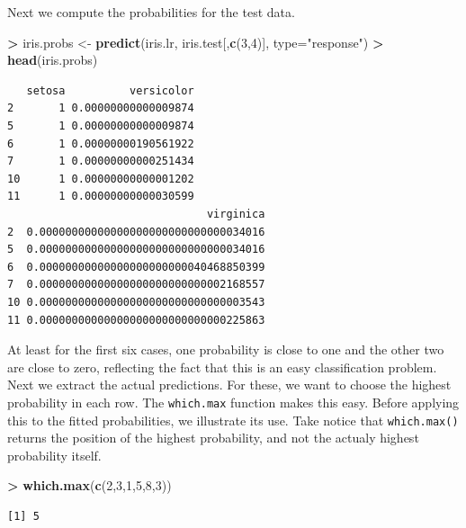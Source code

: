 \documentclass[
]{krantz}
\makeatletter
\newenvironment{Shaded}{\begin{snugshade}}{\end{snugshade}}
\newcommand{\DataTypeTok}[1]{\textcolor[rgb]{0.27,0.27,0.27}{#1}}
\newcommand{\DecValTok}[1]{\textcolor[rgb]{0.06,0.06,0.06}{#1}}
\newcommand{\KeywordTok}[1]{\textcolor[rgb]{0.27,0.27,0.27}{\textbf{#1}}}
\newcommand{\NormalTok}[1]{#1}
\newcommand{\OperatorTok}[1]{\textcolor[rgb]{0.43,0.43,0.43}{\textbf{#1}}}
\newcommand{\StringTok}[1]{\textcolor[rgb]{0.5,0.5,0.5}{#1}}
\newenvironment{kframe}{%
\medskip{}
\setlength{\fboxsep}{.8em}
 \def\at@end@of@kframe{}%
 \ifinner\ifhmode%
  \def\at@end@of@kframe{\end{minipage}}%
  \begin{minipage}{\columnwidth}%
 \fi\fi%
 \def\FrameCommand##1{\hskip\@totalleftmargin \hskip-\fboxsep
 \colorbox{shadecolor}{##1}\hskip-\fboxsep
     \hskip-\linewidth \hskip-\@totalleftmargin \hskip\columnwidth}%
 \MakeFramed {\advance\hsize-\width
   \@totalleftmargin\z@ \linewidth\hsize
   \@setminipage}}%
 {\par\unskip\endMakeFramed%
 \at@end@of@kframe}
\renewenvironment{Shaded}{\begin{kframe}}{\end{kframe}}
\makeatother
\begin{document}
Next we compute the probabilities for the test data.

\begin{Shaded}
\begin{Highlighting}[]
\OperatorTok{\textgreater{}}\StringTok{ }\NormalTok{iris.probs \textless{}{-}}\StringTok{ }\KeywordTok{predict}\NormalTok{(iris.lr, iris.test[,}\KeywordTok{c}\NormalTok{(}\DecValTok{3}\NormalTok{,}\DecValTok{4}\NormalTok{)], }\DataTypeTok{type=}\StringTok{"response"}\NormalTok{)}
\OperatorTok{\textgreater{}}\StringTok{ }\KeywordTok{head}\NormalTok{(iris.probs)}
\end{Highlighting}
\end{Shaded}

\begin{verbatim}
   setosa          versicolor
2       1 0.00000000000009874
5       1 0.00000000000009874
6       1 0.00000000190561922
7       1 0.00000000000251434
10      1 0.00000000000001202
11      1 0.00000000000030599
                               virginica
2  0.00000000000000000000000000000034016
5  0.00000000000000000000000000000034016
6  0.00000000000000000000000040468850399
7  0.00000000000000000000000000002168557
10 0.00000000000000000000000000000003543
11 0.00000000000000000000000000000225863
\end{verbatim}

At least for the first six cases, one probability is close to one and the other two are close to zero, reflecting the fact that this is an easy classification problem. Next we extract the actual predictions. For these, we want to choose the highest probability in each row. The \texttt{which.max} function makes this easy. Before applying this to the fitted probabilities, we illustrate its use. Take notice that \texttt{which.max()} returns the position of the highest probability, and not the actualy highest probability itself.

\begin{Shaded}
\begin{Highlighting}[]
\OperatorTok{\textgreater{}}\StringTok{ }\KeywordTok{which.max}\NormalTok{(}\KeywordTok{c}\NormalTok{(}\DecValTok{2}\NormalTok{,}\DecValTok{3}\NormalTok{,}\DecValTok{1}\NormalTok{,}\DecValTok{5}\NormalTok{,}\DecValTok{8}\NormalTok{,}\DecValTok{3}\NormalTok{))}
\end{Highlighting}
\end{Shaded}

\begin{verbatim}
[1] 5
\end{verbatim}
\end{document}
